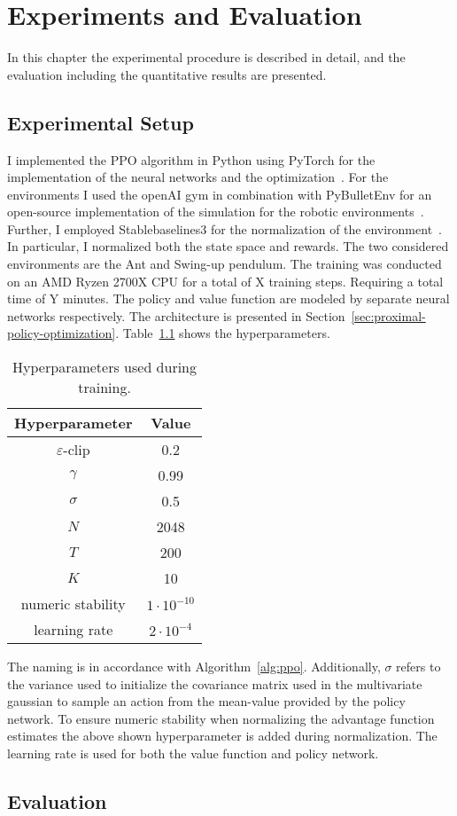 \chapter{Experiments and Evaluation}\label{ch:experiments-and-evaluation}
In this chapter the experimental procedure is described in detail, and the evaluation
including the quantitative results are presented.


\section{Experimental Setup}\label{sec:experimental-setup}
I implemented the PPO algorithm in Python using PyTorch for the implementation of the
neural networks and the optimization~\cite{NEURIPS2019_9015}.
For the environments I used the openAI gym in combination with PyBulletEnv for an open-source implementation of the simulation
for the robotic environments~\cite{brockman2016openai,benelot2018}.
Further, I employed Stablebaselines3 for the normalization of the environment~\cite{stable-baselines3}.
In particular, I normalized both the state space and rewards.
The two considered environments are the Ant and Swing-up pendulum. %
The training was conducted on an AMD Ryzen 2700X CPU for a total of X training steps. %
Requiring a total time of Y minutes. %
The policy and value function are modeled by separate neural networks respectively.
The architecture is presented in Section~\ref{sec:proximal-policy-optimization}.
Table~\ref{tab:hyp} shows the hyperparameters.
\begin{table}[h]
    \centering
    \begin{tabular}{c|c}
        \toprule
        Hyperparameter & Value \\
        \midrule
        $\varepsilon$-clip & 0.2\\
        $\gamma$ & 0.99\\
        $\sigma$ & 0.5\\
        $N$ & 2048\\
        $T$ & 200\\
        $K$ & 10\\
        numeric stability & $1\cdot 10^{-10}$\\
        learning rate & $2\cdot 10^{-4}$\\
        \bottomrule
    \end{tabular}
    \caption{Hyperparameters used during training.}
    \label{tab:hyp}
\end{table}
The naming is in accordance with Algorithm~\ref{alg:ppo}.
Additionally, $\sigma$ refers to the variance used to initialize the covariance matrix used in the multivariate gaussian
to sample an action from the mean-value provided by the policy network.
To ensure numeric stability when normalizing the advantage function estimates the above shown hyperparameter is added
during normalization.
The learning rate is used for both the value function and policy network.

\section{Evaluation}\label{sec:evaluation}
